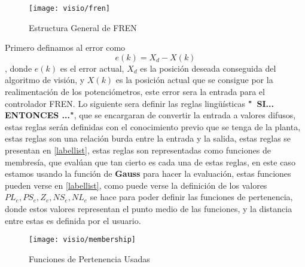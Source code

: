     
\begin{figure}[h]
	\centering
	\texttt{[image: visio/fren]}
	\caption{Estructura General de FREN}
	\label{fig:fren}
\end{figure}
    
    
    Primero definamos al error como \begin{equation}
    	e(k)=X_d - X(k)
    \end{equation}, donde $e(k)$ es el error actual, $X_d$ es la posición deseada conseguida del algoritmo de visión, y $X(k)$ es la posición actual que se consigue por la realimentación de los potenciómetros, este error sera la entrada para el controlador FREN.
    Lo siguiente sera definir las reglas lingüísticas \textbf{"\ SI... ENTONCES ..."}, que se encargaran de convertir la entrada a valores difusos, estas reglas serán definidas con el conocimiento previo que se tenga de la planta, estas reglas son una relación burda entre la entrada y la salida, estas reglas se presentan en \ref{labellist}, estas reglas son representadas como funciones de membresía, que evalúan que tan cierto es cada una de estas reglas, en este caso estamos usando la función de \textbf{Gauss} para hacer la evaluación, estas funciones pueden verse en \ref{labellist}, como puede verse la definición de los valores $PL_e,PS_e,Z_e,NS_e,NL_e $ se hace para poder definir las funciones de pertenencia, donde estos valores representan el punto medio de las funciones, y la distancia entre estas es definida por el usuario.
    
    
\begin{figure}[h]
	\centering
	\texttt{[image: visio/membership]}
	\caption{Funciones de Pertenencia Usadas}
	\label{fig:membership}
\end{figure}
    
